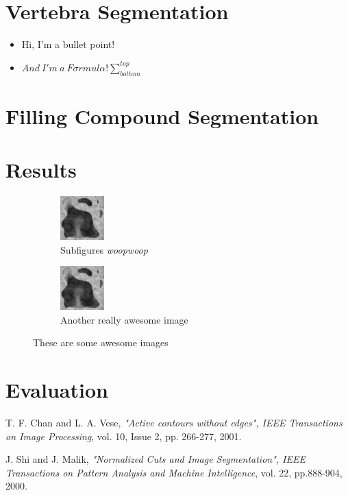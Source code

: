 \documentclass{article}
\begin{document}
  \section{Vertebra Segmentation}
  \begin{itemize}
  	\item Hi, I'm a bullet point!
  	\item $And~ I'm~ a~ F{\sigma}rmul{\alpha}! \sum_{bottom}^{top}$
  \end{itemize}
  
  \section{Filling Compound Segmentation}
  
  \pagebreak
  
  \section{Results}
  {
  \begin{figure}[h]
          \centering
    \begin{subfigure}[t]{0.45\linewidth}
      \centering
      \includegraphics{test.png}
      \caption{Subfigures \textit{woopwoop}}
    \end{subfigure}
    \hfill
    \begin{subfigure}[t]{0.45\linewidth}
      \centering
      \includegraphics{test.png}
      \caption{Another really awesome image}
    \end{subfigure}
    \caption{These are some awesome images}
  \end{figure}
  }

  \section{Evaluation}
  
  \pagebreak
  
	\begin{thebibliography}{9}
	
	\bibitem{[ChanVese01]}
	T. F. Chan and L. A. Vese,
	\emph{"Active contours without edges", IEEE Transactions on Image Processing},
	vol. 10, Issue 2, pp. 266-277, 2001.
	
	
	\bibitem{[ShiMalik00]}
	J.  Shi  and  J.  Malik,
	\emph{"Normalized Cuts and Image Segmentation", IEEE Transactions on Pattern Analysis and Machine Intelligence},
	vol. 22, pp.888-904,
	2000.
	
	\end{thebibliography}
\end{document}
